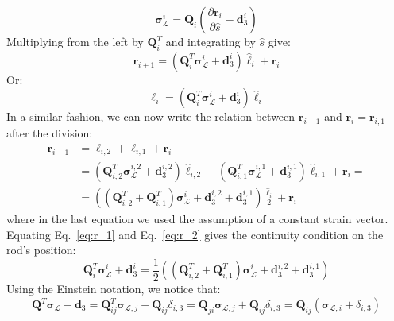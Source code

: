 \documentclass[a4paper, 11pt]{article}
\begin{document}
\begin{equation}
    \boldsymbol{\sigma}^i_\mathcal{L}=\boldsymbol{Q}_i\left(\frac{\partial \boldsymbol{r}_i}{\partial \hat{s}}-\boldsymbol{d}^i_3\right)
\end{equation}
Multiplying from the left by $\boldsymbol{Q}^T_i$ and integrating by $\hat{s}$ give:
\begin{equation}\label{eq:r_1}
    \boldsymbol{r}_{i+1}=\left(\boldsymbol{Q}^T_i\boldsymbol{\sigma}^i_\mathcal{L}+\boldsymbol{d}^i_3\right)\hat{\ell}_i+\boldsymbol{r}_{i}
\end{equation}
Or:
\begin{equation}
    \boldsymbol{\ell}_i=\left(\boldsymbol{Q}^T_i\boldsymbol{\sigma}^i_\mathcal{L}+\boldsymbol{d}^i_3\right)\hat{\ell}_i
\end{equation}
In a similar fashion, we can now write the relation between $\boldsymbol{r}_{i+1} $ and $\boldsymbol{r}_{i}=\boldsymbol{r}_{i,1}$ after the division:
\begin{align}
    \boldsymbol{r}_{i+1}&=\boldsymbol{\ell}_{i,2}+\boldsymbol{\ell}_{i,1}+\boldsymbol{r}_{i}\nonumber\\
    &=\left(\boldsymbol{Q}^T_{i,2}\boldsymbol{\sigma}^{i,2}_\mathcal{L}+\boldsymbol{d}^{i,2}_3\right)\hat{\ell}_{i,2}+\left(\boldsymbol{Q}^T_{i,1}\boldsymbol{\sigma}^{i,1}_\mathcal{L}+\boldsymbol{d}^{i,1}_3\right)\hat{\ell}_{i,1}+\boldsymbol{r}_{i}=\nonumber\\
    &=\left(\left(\boldsymbol{Q}^T_{i,2}+\boldsymbol{Q}^T_{i,1}\right)\boldsymbol{\sigma}^{i}_\mathcal{L}+\boldsymbol{d}^{i,2}_3+\boldsymbol{d}^{i,1}_3\right)\frac{\hat{\ell}_{i}}{2}+\boldsymbol{r}_{i}\label{eq:r_2}
\end{align}
where in the last equation we used the assumption of a constant strain vector.
Equating Eq.~\ref{eq:r_1} and Eq.~\ref{eq:r_2} gives the continuity condition on the rod's position:
\begin{equation}\label{eq:cond_pos}
    \boldsymbol{Q}^T_i\boldsymbol{\sigma}^i_\mathcal{L}+\boldsymbol{d}^i_3=\frac{1}{2}\left(\left(\boldsymbol{Q}^T_{i,2}+\boldsymbol{Q}^T_{i,1}\right)\boldsymbol{\sigma}^{i}_\mathcal{L}+\boldsymbol{d}^{i,2}_3+\boldsymbol{d}^{i,1}_3\right)
\end{equation}
Using the Einstein notation, we notice that:
\begin{equation}\label{eq:EIN}
   \boldsymbol{Q}^T\boldsymbol{\sigma}_\mathcal{L}+\boldsymbol{d}_3=\boldsymbol{Q}^T_{ij} \boldsymbol{\sigma}_{\mathcal{L},j}+\boldsymbol{Q}_{ij}\delta_{i,3}=\boldsymbol{Q}_{ji} \boldsymbol{\sigma}_{\mathcal{L},j}+\boldsymbol{Q}_{ij}\delta_{i,3}=\boldsymbol{Q}_{ij}\left(\boldsymbol{\sigma}_{\mathcal{L},i}+\delta_{i,3}\right)
\end{equation}
\end{document}
